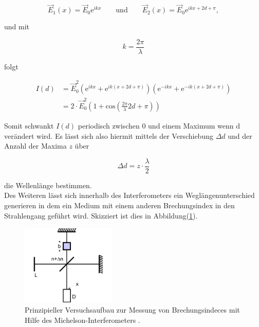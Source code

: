         \begin{equation}
            \vec{E}_1(x) = \vec{E}_0 \text{e}^{ikx} \quad \quad \text{und} \quad \quad \vec{E}_2(x) = \vec{E}_0 \text{e}^{ikx + 2d +\pi} ,    \nonumber 
        \end{equation}

        \noindent und mit 

        \begin{equation*}
            k = \frac{2 \pi}{\lambda}
        \end{equation*}

        \noindent folgt

        \begin{align}
            I(d) &= \vec{E}_0^2 \left( \text{e}^{ikx} + \text{e}^{ik(x + 2d + \pi)} \right) \left( \text{e}^{-ikx} + \text{e}^{-ik(x + 2d + \pi)} \right) \\    \nonumber 
                 &= 2 \cdot \vec{E}_0^2  \left( 1 + \text{cos} \left( \frac{2 \pi}{\lambda} 2 d + \pi \right) \right)    \nonumber 
        \end{align}

        \noindent Somit schwankt $I(d)$ periodisch zwischen 0 und einem Maximum wenn d verändert wird. Es lässt sich also hiermit mittels der 
        Verschiebung $\Delta d$ und der Anzahl der Maxima $z$ über 

        \begin{equation}
            \Delta d = z \cdot \frac{\lambda}{2}    \nonumber 
        \end{equation}

        \noindent die Wellenlänge bestimmen.\\

        \noindent Des Weiteren lässt sich innerhalb des Interferometers ein Weglängenunterschied generieren in dem ein Medium mit einem anderen 
        Brechungsindex in den Strahlengang geführt wird. Skizziert ist dies in Abbildung(\ref{img:5}).

        \begin{figure}[ht]
            \centering
            \includegraphics[width=0.4\textwidth]{latex/images/PrinOrd.PNG}
            \caption{Prinzipieller Versuchsaufbau zur Messung von Brechungsindeces mit Hilfe des Michelson-Interferometers \protect \cite{V401}.}
            \label{img:5}
        \end{figure}

